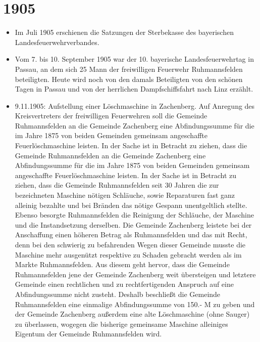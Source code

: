 \documentclass[12pt,a4paper]{book}
\begin{document}
\section*{1905}

\begin{itemize}
\item Im Juli 1905 erschienen die Satzungen der Sterbekasse des bayerischen
Landesfeuerwehrverbandes.

\item Vom 7. bis 10. September 1905 war der 10. bayerische Landesfeuerwehrtag in
Passau, an dem sich 25 Mann der freiwilligen Feuerwehr Ruhmannsfelden
beteiligten. Heute wird noch von den damals Beteiligten von den schönen Tagen in
Passau und von der herrlichen Dampfschiffsfahrt nach Linz erzählt.

\item 9.11.1905: Aufstellung einer Löschmaschine in Zachenberg. Auf Anregung des
Kreisvertreters der freiwilligen Feuerwehren soll die Gemeinde Ruhmannsfelden an
die Gemeinde Zachenberg eine Abfindungssumme für die im Jahre 1875 von beiden
Gemeinden gemeinsam angeschaffte Feuerlöschmaschine leisten. In der Sache ist in
Betracht zu ziehen, dass die Gemeinde Ruhmannsfelden an die Gemeinde Zachenberg
eine Abfindungssumme für die im Jahre 1875 von beiden Gemeinden gemeinsam
angeschaffte Feuerlöschmaschine leisten. In der Sache ist in Betracht zu ziehen,
dass die Gemeinde Ruhmannsfelden seit 30 Jahren die zur bezeichneten Maschine
nötigen Schläuche, sowie Reparaturen fast ganz alleinig bezahlte und bei Bränden
das nötige Gespann unentgeltlich stellte. Ebenso besorgte Ruhmannsfelden die
Reinigung der Schläuche, der Maschine und die Instandsetzung derselben. Die
Gemeinde Zachenberg leistete bei der Anschaffung einen höheren Betrag als
Ruhmannsfelden und das mit Recht, denn bei den schwierig zu befahrenden Wegen
dieser Gemeinde musste die Maschine mehr ausgenützt respektive zu Schaden
gebracht werden als im Markte Ruhmannsfelden. Aus diesem geht hervor, dass die
Gemeinde Ruhmannsfelden jene der Gemeinde Zachenberg weit übersteigen und
letztere Gemeinde einen rechtlichen und zu rechtfertigenden Anspruch auf eine
Abfindungssumme nicht zusteht. Deshalb beschließt die Gemeinde Ruhmannsfelden
eine einmalige Abfindungssumme von 150.- M zu geben und der Gemeinde Zachenberg
außerdem eine alte Löschmaschine (ohne Sauger) zu überlassen, wogegen die
bisherige gemeinsame Maschine alleiniges Eigentum der Gemeinde Ruhmannsfelden
wird.
\end{itemize}
\end{document}
